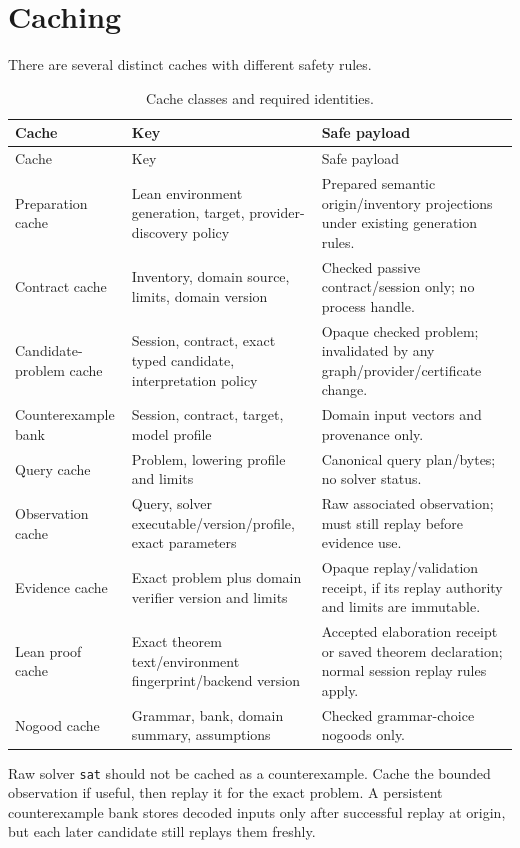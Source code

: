 \documentclass[11pt,oneside]{report}
\begin{document}
\section{Caching}

There are several distinct caches with different safety rules.

\begin{longtable}{@{}L{0.20\textwidth}L{0.32\textwidth}L{0.39\textwidth}@{}}
\caption{Cache classes and required identities.}\label{tab:caches}\\
\toprule
Cache & Key & Safe payload \\
\midrule
\endfirsthead
\toprule
Cache & Key & Safe payload \\
\midrule
\endhead
\bottomrule
\endfoot
Preparation cache & Lean environment generation, target, provider-discovery policy & Prepared semantic origin/inventory projections under existing generation rules. \\
Contract cache & Inventory, domain source, limits, domain version & Checked passive contract/session only; no process handle. \\
Candidate-problem cache & Session, contract, exact typed candidate, interpretation policy & Opaque checked problem; invalidated by any graph/provider/certificate change. \\
Counterexample bank & Session, contract, target, model profile & Domain input vectors and provenance only. \\
Query cache & Problem, lowering profile and limits & Canonical query plan/bytes; no solver status. \\
Observation cache & Query, solver executable/version/profile, exact parameters & Raw associated observation; must still replay before evidence use. \\
Evidence cache & Exact problem plus domain verifier version and limits & Opaque replay/validation receipt, if its replay authority and limits are immutable. \\
Lean proof cache & Exact theorem text/environment fingerprint/backend version & Accepted elaboration receipt or saved theorem declaration; normal session replay rules apply. \\
Nogood cache & Grammar, bank, domain summary, assumptions & Checked grammar-choice nogoods only. \\
\end{longtable}

Raw solver \texttt{sat} should not be cached as a counterexample. Cache the bounded observation if useful, then replay it for the exact problem. A persistent counterexample bank stores decoded inputs only after successful replay at origin, but each later candidate still replays them freshly.
\end{document}

